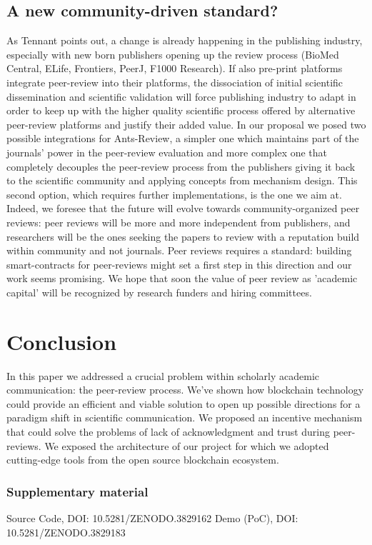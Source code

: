 \documentclass[runningheads]{llncs}
\begin{document}
\subsection{A new community-driven standard?}
As Tennant points out\cite{Tennant2017-F1000R}, a change is already happening in the publishing industry, especially with new born publishers opening up the review process (BioMed Central, ELife, Frontiers, PeerJ, F1000 Research). If also pre-print platforms integrate peer-review into their platforms, the dissociation of initial scientific dissemination and scientific validation will force publishing industry to adapt in order to keep up with the higher quality scientific process offered by alternative peer-review platforms and justify their added value.
In our proposal we posed two possible integrations for Ants-Review, a simpler one which maintains part of the journals' power in the peer-review evaluation and more complex one that completely decouples the peer-review process from the publishers giving it back to the scientific community and applying concepts from mechanism design. This second option, which requires further implementations, is the one we aim at. Indeed, we foresee that the future will evolve towards community-organized peer reviews: peer reviews will be more and more independent from publishers, and researchers will be the ones seeking the papers to review with a reputation build within community and not journals.
Peer reviews requires a standard: building smart-contracts for peer-reviews might set a first step in this direction and our work seems promising. We hope that soon the value of peer review as 'academic capital' will be recognized by research funders and hiring committees.

\section{Conclusion}
In this paper we addressed a crucial problem within scholarly academic communication: the peer-review process. We've shown how blockchain technology could provide an efficient and viable solution to open up possible directions for a paradigm shift in scientific communication. We proposed an incentive mechanism that could solve the problems of lack of acknowledgment and trust during peer-reviews. We exposed the architecture of our project for which we adopted cutting-edge tools from the open source blockchain ecosystem.

\subsubsection{Supplementary material}
Source Code, DOI: 10.5281/ZENODO.3829162
\newline Demo (PoC), DOI: 10.5281/ZENODO.3829183
\end{document}
